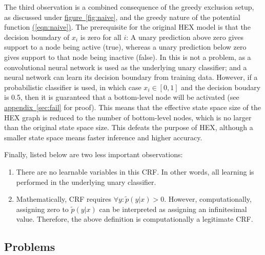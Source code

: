 \documentclass[11pt,a4paper]{article}
\begin{document}
The third observation is a combined consequence of the greedy exclusion setup, as discussed under \hyperref[fig:naive]{figure~\ref{fig:naive}}, and the greedy nature of the potential function \hyperref[eqn:naive]{(\ref{eqn:naive})}. The prerequisite for the original HEX model is that the decision boundary of $x_i$ is zero for all $i$: A unary prediction above zero gives support to a node being active (true), whereas a unary prediction below zero gives support to that node being inactive (false). In \cite{deng2014large} this is not a problem, as a convolutional neural network \cite{krizhevsky2012imagenet} is used as the underlying unary classifier; and a neural network can learn its decision boundary from training data. However, if a probabilistic classifier is used, in which case $x_i\in[0,1]$ and the decision boudary is 0.5, then it is guaranteed that a bottom-level node will be activated (see \hyperref[sec:fail]{appendix~\ref{sec:fail}} for proof). This means that the effective state space size of the HEX graph is reduced to the number of bottom-level nodes, which is no larger than the original state space size. This defeats the purpose of HEX, although a smaller state space means faster inference and higher accuracy.

Finally, listed below are two less important observations:
\begin{enumerate}
\item There are no learnable variables in this CRF. In other words, all learning is performed in the underlying unary classifier.
\item Mathematically, CRF requires $\forall y:\tilde{p}(y|x)>0$. However, computationally, assigning zero to $\tilde{p}(y|x)$ can be interpreted as assigning an infinitesimal value. Therefore, the above definition is computationally a legitimate CRF.
\end{enumerate}

\subsection{Problems}
\label{sec:problem}
\end{document}
